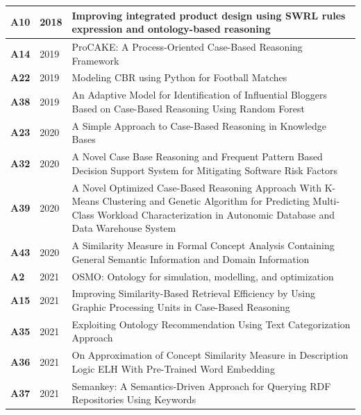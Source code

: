{\begin{longtable}{ | m{1cm} | m{1.5cm} | m{12cm} | }
                    \hline
                    \textbf{A10} &2018 &Improving integrated product design using SWRL rules expression and ontology-based reasoning \\
                    \hline
                    \textbf{A14} &2019 &ProCAKE: A Process-Oriented Case-Based Reasoning Framework \\
                    \hline
                    \textbf{A22} &2019 &Modeling CBR using Python for Football Matches \\
                    \hline
                    \textbf{A38} &2019 &An Adaptive Model for Identification of Influential Bloggers Based on Case-Based Reasoning Using Random Forest \\
                    \hline
                    \textbf{A23} &2020 &A Simple Approach to Case-Based Reasoning in Knowledge Bases \\
                    \hline
                    \textbf{A32} &2020 &A Novel Case Base Reasoning and Frequent Pattern Based Decision Support System for Mitigating Software Risk Factors \\
                    \hline
                    \textbf{A39} &2020 &A Novel Optimized Case-Based Reasoning Approach With K-Means Clustering and Genetic Algorithm for Predicting Multi-Class Workload Characterization in Autonomic Database and Data Warehouse System \\
                    \hline
                    \textbf{A43} &2020 &A Similarity Measure in Formal Concept Analysis Containing General Semantic Information and Domain Information \\
                    \hline
                    \textbf{A2} &2021 &OSMO: Ontology for simulation, modelling, and optimization \\
                    \hline
                    \textbf{A15} &2021 &Improving Similarity-Based Retrieval Efficiency by Using Graphic Processing Units in Case-Based Reasoning \\
                    \hline
                    \textbf{A35} &2021 &Exploiting Ontology Recommendation Using Text Categorization Approach \\
                    \hline
                    \textbf{A36} &2021 &On Approximation of Concept Similarity Measure in Description Logic ELH With Pre-Trained Word Embedding \\
                    \hline
                    \textbf{A37} &2021 &Semankey: A Semantics-Driven Approach for Querying RDF Repositories Using Keywords \\

\end{longtable}}
